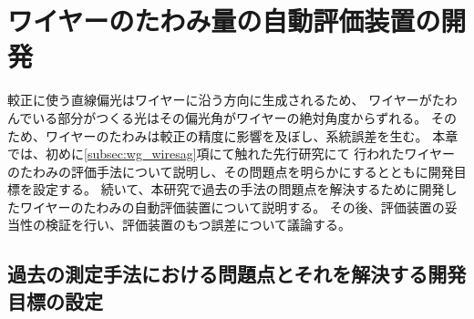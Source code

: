 \documentclass[../../main.tex]{subfiles}
\begin{document}
\chapter{ワイヤーのたわみ量の自動評価装置の開発}
\label{chap:wiresag}
較正に使う直線偏光はワイヤーに沿う方向に生成されるため、
ワイヤーがたわんでいる部分がつくる光はその偏光角がワイヤーの絶対角度からずれる。
そのため、ワイヤーのたわみは較正の精度に影響を及ぼし、系統誤差を生む。
本章では、初めに\ref{subsec:wg_wiresag}項にて触れた先行研究\cite{swg:murata}\cite{swg:iijima}にて
行われたワイヤーのたわみの評価手法について説明し、その問題点を明らかにするとともに開発目標を設定する。
続いて、本研究で過去の手法の問題点を解決するために開発したワイヤーのたわみの自動評価装置について説明する。
その後、評価装置の妥当性の検証を行い、評価装置のもつ誤差について議論する。

\section{過去の測定手法における問題点とそれを解決する開発目標の設定}
\end{document}
